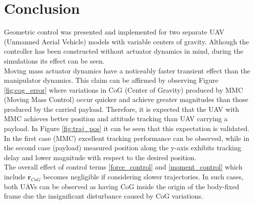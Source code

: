 \section{Conclusion} \label{sec:conclusion}
Geometric control was presented and implemented for two separate UAV (Unmanned Aerial Vehicle) models with variable centers of gravity. Although the controller has been constructed without actuator dynamics in mind, during the simulations its effect can be seen. \\
Moving mass actuator dynamics have a noticeably faster transient effect than the manipulator dynamics. This claim can be affirmed by observing Figure \ref{fig:cog_error} where variations in CoG (Center of Gravity) produced by MMC (Moving Mass Control) occur quicker and achieve greater magnitudes than those produced by the carried payload. Therefore, it is expected that the UAV with MMC achieves better position and attitude tracking than UAV carrying a payload. In Figure \ref{fig:traj_pos} it can be seen that this expectation is validated. In the first case (MMC) excellent tracking performance can be observed, while in the second case (payload) measured position along the y-axis exhibits tracking delay and lower magnitude with respect to the desired position. \\
The overall effect of control terms \eqref{force_control} and \eqref{moment_control} which include $\textbf{r}_{CoG}$ becomes negligible if considering slower trajectories. In such cases, both UAVs can be observed as having CoG inside the origin of the body-fixed frame due the insignificant disturbance caused by CoG variations. 
